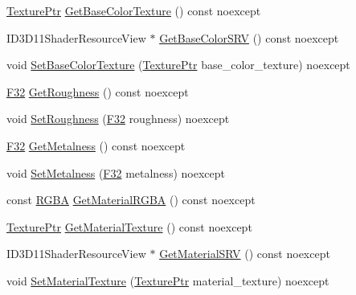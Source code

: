\begin{DoxyCompactItemize}
\item 
\mbox{\hyperlink{namespacemage_1_1rendering_a6f3ae54f825328465b0cdde0f0de4a36}{Texture\+Ptr}} \mbox{\hyperlink{classmage_1_1rendering_1_1_material_ac9ce1aff5b5e3d34ae83eb194786cebe}{Get\+Base\+Color\+Texture}} () const noexcept
\item 
I\+D3\+D11\+Shader\+Resource\+View $\ast$ \mbox{\hyperlink{classmage_1_1rendering_1_1_material_a363d85135b18e4e8c8a0b1d2fd88a435}{Get\+Base\+Color\+S\+RV}} () const noexcept
\item 
void \mbox{\hyperlink{classmage_1_1rendering_1_1_material_aae6ebdb492e06a39e1f420154962ab0f}{Set\+Base\+Color\+Texture}} (\mbox{\hyperlink{namespacemage_1_1rendering_a6f3ae54f825328465b0cdde0f0de4a36}{Texture\+Ptr}} base\+\_\+color\+\_\+texture) noexcept
\item 
\mbox{\hyperlink{namespacemage_aa97e833b45f06d60a0a9c4fc22ae02c0}{F32}} \mbox{\hyperlink{classmage_1_1rendering_1_1_material_a4c950a1b95e14246027de8ff0da4d55a}{Get\+Roughness}} () const noexcept
\item 
void \mbox{\hyperlink{classmage_1_1rendering_1_1_material_a1504fb6523526ee9897b20851a3b84e9}{Set\+Roughness}} (\mbox{\hyperlink{namespacemage_aa97e833b45f06d60a0a9c4fc22ae02c0}{F32}} roughness) noexcept
\item 
\mbox{\hyperlink{namespacemage_aa97e833b45f06d60a0a9c4fc22ae02c0}{F32}} \mbox{\hyperlink{classmage_1_1rendering_1_1_material_aaa4265533437b462e2f2087cfa37e623}{Get\+Metalness}} () const noexcept
\item 
void \mbox{\hyperlink{classmage_1_1rendering_1_1_material_a46b3297fb948c4fec3447caa35f96918}{Set\+Metalness}} (\mbox{\hyperlink{namespacemage_aa97e833b45f06d60a0a9c4fc22ae02c0}{F32}} metalness) noexcept
\item 
const \mbox{\hyperlink{structmage_1_1_r_g_b_a}{R\+G\+BA}} \mbox{\hyperlink{classmage_1_1rendering_1_1_material_a0464566ef674bf074d0af22e852daaa3}{Get\+Material\+R\+G\+BA}} () const noexcept
\item 
\mbox{\hyperlink{namespacemage_1_1rendering_a6f3ae54f825328465b0cdde0f0de4a36}{Texture\+Ptr}} \mbox{\hyperlink{classmage_1_1rendering_1_1_material_aa396990a630c749a46a8a9fc88e80683}{Get\+Material\+Texture}} () const noexcept
\item 
I\+D3\+D11\+Shader\+Resource\+View $\ast$ \mbox{\hyperlink{classmage_1_1rendering_1_1_material_ae1e1f712801dd1f16a695692df4f4f23}{Get\+Material\+S\+RV}} () const noexcept
\item 
void \mbox{\hyperlink{classmage_1_1rendering_1_1_material_a6bf886a16cbe84c55664701ab3a82658}{Set\+Material\+Texture}} (\mbox{\hyperlink{namespacemage_1_1rendering_a6f3ae54f825328465b0cdde0f0de4a36}{Texture\+Ptr}} material\+\_\+texture) noexcept

\end{DoxyCompactItemize}
